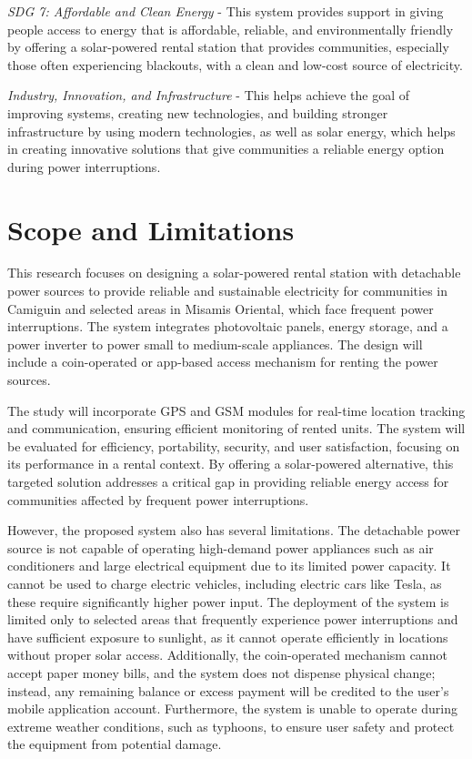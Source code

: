 {\textit{SDG 7: Affordable and Clean Energy} - This system provides support in giving people access to energy that is affordable, reliable, and environmentally friendly by offering a solar-powered rental station that provides communities, especially those often experiencing blackouts, with a clean and low-cost source of electricity.

\textit{Industry, Innovation, and Infrastructure} - This helps achieve the goal of improving systems, creating new technologies, and building stronger infrastructure by using modern technologies, as well as solar energy, which helps in creating innovative solutions that give communities a reliable energy option during power interruptions.


\section{Scope and Limitations}

This research focuses on designing a solar-powered rental station with detachable power sources to provide reliable and sustainable electricity for communities in Camiguin and selected areas in Misamis Oriental, which face frequent power interruptions. The system integrates photovoltaic panels, energy storage, and a power inverter to power small to medium-scale appliances. The design will include a coin-operated or app-based access mechanism for renting the power sources.

The study will incorporate GPS and GSM modules for real-time location tracking and communication, ensuring efficient monitoring of rented units. The system will be evaluated for efficiency, portability, security, and user satisfaction, focusing on its performance in a rental context.	 By offering a solar-powered alternative, this targeted solution addresses a critical gap in providing reliable energy access for communities affected by frequent power interruptions.

However, the proposed system also has several limitations. The detachable power source is not capable of operating high-demand power appliances such as air conditioners and large electrical equipment due to its limited power capacity. It cannot be used to charge electric vehicles, including electric cars like Tesla, as these require significantly higher power input. The deployment of the system is limited only to selected areas that frequently experience power interruptions and have sufficient exposure to sunlight, as it cannot operate efficiently in locations without proper solar access. Additionally, the coin-operated mechanism cannot accept paper money bills, and the system does not dispense physical change; instead, any remaining balance or excess payment will be credited to the user’s mobile application account. Furthermore, the system is unable to operate during extreme weather conditions, such as typhoons, to ensure user safety and protect the equipment from potential damage.

}
